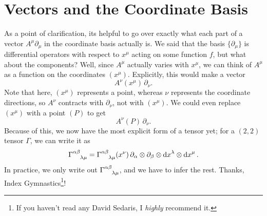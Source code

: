 \section{Vectors and the Coordinate Basis}
As a point of clarification, its helpful to go over exactly what each part of a vector $A^\mu \partial_\mu$ in the coordinate basis actually is.
We said that the basis $\{\partial_\mu\}$ is differential operators with respect to $x^\mu$ acting on some function $f$, but what about the components?
Well, since $A^\mu$ actually varies with $x^\mu$, we can think of $A^\mu$ as a function on the coordinates $(x^\mu)$.
Explicitly, this would make a vector
\[ A^\nu(x^\mu)\,\partial_\nu. \]
Note that here, $(x^\mu)$ represents a point, whereas $\nu$ represents the coordinate directions, so $A^\nu$ contracts with $\partial_\nu$, not with $(x^\mu)$.
We could even replace $(x^\mu)$ with a point $(P)$ to get
\[ A^\nu (P)\, \partial_\nu. \]
Because of this, we now have the most explicit form of a tensor yet; for a $(2,2)$ tensor $\Gamma$, we can write it as
\[ \tensor{\Gamma}{^{\alpha\beta}_{\lambda\mu}} = \tensor{\Gamma}{^{\alpha\beta}_{\lambda\mu}} (x^\nu) \,\partial_\alpha \otimes \partial_\beta \otimes \dd{x}^\lambda \otimes \dd{x}^\mu. \]
In practice, we only write out $\tensor{\Gamma}{^{\alpha\beta}_{\lambda\mu}}$, and we have to infer the rest.
Thanks, Index Gymnastics\footnote{If you haven't read any David Sedaris, I \emph{highly} recommend it.}!
